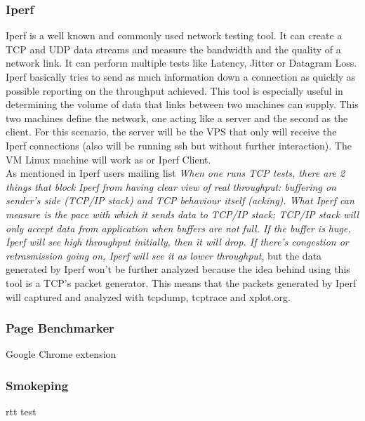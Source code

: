 \subsubsection{Iperf}
Iperf is a well known and commonly used network testing tool. It can create a
TCP and UDP data streams and measure the bandwidth and the quality of a network
link. It can perform multiple tests like Latency, Jitter or Datagram Loss.\\

Iperf basically tries to send as much information down a connection as quickly
as possible reporting on the throughput achieved. This tool is especially useful
in determining the volume of data that links between two machines can supply.
This two machines define the network, one acting like a server and the second as
the client. For this scenario, the server will be the VPS that only will receive
the Iperf connections (also will be running ssh but without further
interaction). The VM Linux machine will work as or Iperf Client.\\  

As mentioned in Iperf users mailing list \textit{
When one runs TCP tests, there are 2 things that block Iperf from having clear
view of real throughput: buffering on sender's side (TCP/IP stack) and TCP
behaviour itself (acking). What Iperf can measure is the pace with which it
sends data to TCP/IP stack; TCP/IP stack will only accept data from application
when buffers are not full. If the buffer is huge, Iperf will see high
throughput initially, then it will drop. If there's congestion or retrasmission
going on, Iperf will see it as lower throughput}\cite{iperfmaillist}, but the
data generated by Iperf won't be further analyzed because the  idea behind using
this tool is a TCP's packet generator. This means that the packets generated by 
Iperf will captured and analyzed with tcpdump, tcptrace and xplot.org.\\

\subsubsection{Page Benchmarker}
Google Chrome extension

\subsubsection{Smokeping}
rtt test
